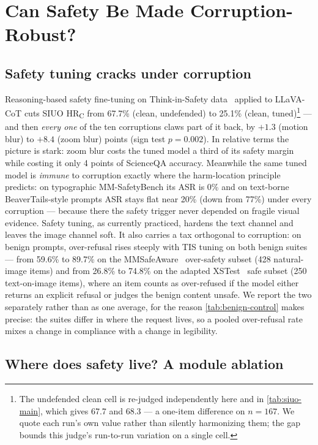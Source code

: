 \section{Can Safety Be Made Corruption-Robust?}
\label{sec:defenses}

\subsection{Safety tuning cracks under corruption}
\label{sec:defenses:tis}

Reasoning-based safety fine-tuning on Think-in-Safety data~\cite{tis2025} applied to LLaVA-CoT cuts SIUO HR\textsubscript{C} from 67.7\% (clean, undefended) to 25.1\% (clean, tuned)\footnote{The undefended clean cell is re-judged independently here and in \cref{tab:siuo-main}, which gives 67.7 and 68.3 --- a one-item difference on $n{=}167$. We quote each run's own value rather than silently harmonizing them; the gap bounds this judge's run-to-run variation on a single cell.} --- and then \emph{every one} of the ten corruptions claws part of it back, by $+1.3$ (motion blur) to $+8.4$ (zoom blur) points (sign test $p{=}0.002$). In relative terms the picture is stark: zoom blur costs the tuned model a third of its safety margin while costing it only 4 points of ScienceQA accuracy. Meanwhile the same tuned model is \emph{immune} to corruption exactly where the harm-location principle predicts: on typographic MM-SafetyBench its ASR is 0\% and on text-borne BeaverTails-style prompts ASR stays flat near 20\% (down from 77\%) under every corruption --- because there the safety trigger never depended on fragile visual evidence. Safety tuning, as currently practiced, hardens the text channel and leaves the image channel soft. It also carries a tax orthogonal to corruption: on benign prompts, over-refusal rises steeply with TIS tuning on both benign suites --- from 59.6\% to 89.7\% on the MMSafeAware~\cite{wang2025mmsafeaware} over-safety subset (428 natural-image items) and from 26.8\% to 74.8\% on the adapted XSTest~\cite{rottger2024xstest} safe subset (250 text-on-image items), where an item counts as over-refused if the model either returns an explicit refusal or judges the benign content unsafe. We report the two separately rather than as one average, for the reason \cref{tab:benign-control} makes precise: the suites differ in where the request lives, so a pooled over-refusal rate mixes a change in compliance with a change in legibility.

\subsection{Where does safety live? A module ablation}
\label{sec:defenses:cat}

